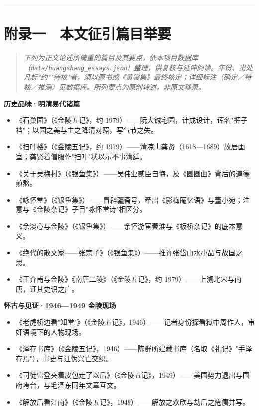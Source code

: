 \documentclass[UTF8,fontset=none,zihao=-4,a4paper]{ctexart}
\begin{document}
\medskip\hrule\medskip

\section{附录一　本文征引篇目举要}


\begin{quote}\small\itshape
下列为正文论述所倚重的篇目及其要点，依本项目数据库（\texttt{data/huangshang\_essays.json}）整理，供复核与延伸阅读。年份、出处凡标"约""待核"者，须以原书或《黄裳集》最终核定；详细标注（确定／待核／推测）见数据库。所列要点为原创转述，非原文移录。
\end{quote}

\textbf{历史品味·明清易代诸篇}

\begin{itemize}
\item 《石巢园》（《金陵五记》，约 1979）——阮大铖宅园，计成设计，诨名"裤子裆"；以园之美与主之降清对照，写气节之失。
\item 《扫叶楼》（《金陵五记》，约 1979）——清凉山龚贤（1618—1689）故居画室；龚贤着僧服作"扫叶"状以示不事清廷。
\item 《关于吴梅村》（《银鱼集》）——吴伟业贰臣自悔，及《圆圆曲》背后的道德煎熬。
\item 《咏怀堂》（《银鱼集》）——冒辟疆斋号，牵出《影梅庵忆语》与董小宛；注意与《金陵杂记》子目"咏怀堂诗"相区分。
\item 《余淡心与金陵》（《银鱼集》）——余怀游宦秦淮与《板桥杂记》的底本意义。
\item 《绝代的散文家——张宗子》（《银鱼集》）——推许张岱山水小品与故国之思。
\item 《王介甫与金陵》《南唐二陵》（《金陵五记》，约 1979）——上溯北宋与南唐，证其史识之广。
\end{itemize}


\textbf{怀古与见证·1946—1949 金陵现场}

\begin{itemize}
\item 《老虎桥边看"知堂"》（《金陵五记》，1946）——记者身份探看狱中周作人，审奸语境下的人物现场。
\item 《泽存书库》（《金陵五记》，1946）——陈群所建藏书库（名取《礼记》"手泽存焉"），书史与汪伪兴亡交织。
\item 《司徒雷登夹着皮包走了以后》（《金陵五记》，1949）——美国势力退出与国府垮台，与毛泽东同年文章互文。
\item 《解放后看江南》（《金陵五记》，1949）——解放之欢欣与劫后之疮痍并写。
\end{itemize}
\end{document}
